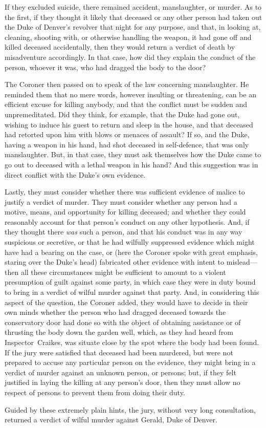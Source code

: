 If they excluded suicide, there remained accident, manslaughter, or murder. As to the first, if they thought it likely that deceased or any other person had taken out the Duke of Denver's revolver that night for any purpose, and that, in looking at, cleaning, shooting with, or otherwise handling the weapon, it had gone off and killed deceased accidentally, then they would return a verdict of death by misadventure accordingly. In that case, how did they explain the conduct of the person, whoever it was, who had dragged the body to the door?

The Coroner then passed on to speak of the law concerning manslaughter.  He reminded them that no mere words, however insulting or threatening, can be an efficient excuse for killing anybody, and that the conflict must be sudden and unpremeditated. Did they think, for example, that the Duke had gone out, wishing to induce his guest to return and sleep in the house, and that deceased had retorted upon him with blows or menaces of assault? If so, and the Duke, having a weapon in his hand, had shot deceased in self-defence, that was only manslaughter. But, in that case, they must ask themselves how the Duke came to go out to deceased with a lethal weapon in his hand? And this suggestion was in direct conflict with the Duke's own evidence.

Lastly, they must consider whether there was sufficient evidence of malice to justify a verdict of murder. They must consider whether any person had a motive, means, and opportunity for killing deceased; and whether they could reasonably account for that person's conduct on any other hypothesis. And, if they thought there \emph{was} such a person, and that his conduct was in any way suspicious or secretive, or that he had wilfully suppressed evidence which might have had a bearing on the case, or (here the Coroner spoke with great emphasis, staring over the Duke's head) fabricated other evidence with intent to mislead—then all these circumstances might be sufficient to amount to a violent presumption of guilt against some party, in which case they were in duty bound to bring in a verdict of wilful murder against that party.  And, in considering this aspect of the question, the Coroner added, they would have to decide in their own minds whether the person who had dragged deceased towards the conservatory door had done so with the object of obtaining assistance or of thrusting the body down the garden well, which, as they had heard from Inspector~Craikes, was situate close by the spot where the body had been found. If the jury were satisfied that deceased had been murdered, but were not prepared to accuse any particular person on the evidence, they might bring in a verdict of murder against an unknown person, or persons; but, if they felt justified in laying the killing at any person's door, then they must allow no respect of persons to prevent them from doing their duty.

Guided by these extremely plain hints, the jury, without very long consultation, returned a verdict of wilful murder against Gerald, Duke of Denver.
